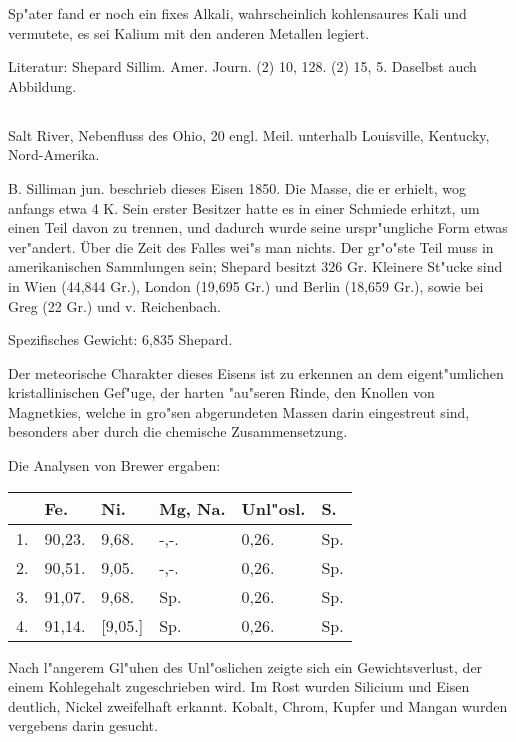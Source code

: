 \documentclass[a4paper, 11pt, oneside]{article}
\begin{document}
Sp"ater fand er noch ein fixes Alkali, wahrscheinlich kohlensaures Kali und vermutete, es sei Kalium mit den anderen Metallen legiert.

\normalsize
Literatur: Shepard Sillim. Amer. Journ. (2) 10, 128. (2) 15, 5. Daselbst auch Abbildung.

\subsection{}
\LARGE
\paragraph{}
Salt River, Nebenfluss des Ohio, 20 engl. Meil. unterhalb Louisville, Kentucky, Nord-Amerika.

B. Silliman jun. beschrieb dieses Eisen 1850. Die Masse, die er erhielt, wog anfangs etwa 4 K. Sein erster Besitzer hatte es in einer Schmiede erhitzt, um einen Teil davon zu trennen, und dadurch wurde seine urspr"ungliche Form etwas ver"andert. Über die Zeit des Falles wei"s man nichts. Der gr"o"ste Teil muss in amerikanischen Sammlungen sein; Shepard besitzt 326 Gr. Kleinere St"ucke sind in Wien (44,844 Gr.), London (19,695 Gr.) und Berlin (18,659 Gr.), sowie bei Greg (22 Gr.) und v. Reichenbach.

Spezifisches Gewicht: 6,835 Shepard.

Der meteorische Charakter dieses Eisens ist zu erkennen an dem eigent"umlichen kristallinischen Gef"uge, der harten "au"seren Rinde, den Knollen von Magnetkies, welche in gro"sen abgerundeten Massen darin eingestreut sind, besonders aber durch die chemische Zusammensetzung.

Die Analysen von Brewer ergaben:
\begin{table}[H]
    \centering\swabfamily\Large
    \begin{tabular}{l l l l l l}
         & Fe. & Ni. & Mg, Na. & Unl"osl. & S. \\ \hline
        1. & 90,23. & 9,68. & -,-. & 0,26. & Sp. \\
        2. & 90,51. & 9,05. & -,-. & 0,26. & Sp. \\
        3. & 91,07. & 9,68. & Sp. & 0,26. & Sp. \\
        4. & 91,14. & [9,05.] & Sp. & 0,26. & Sp. \\
    \end{tabular}
\end{table}

Nach l"angerem Gl"uhen des Unl"oslichen zeigte sich ein Gewichtsverlust, der einem Kohlegehalt zugeschrieben wird. Im Rost wurden Silicium und Eisen deutlich, Nickel zweifelhaft erkannt. Kobalt, Chrom, Kupfer und Mangan wurden vergebens darin gesucht.
\end{document}
